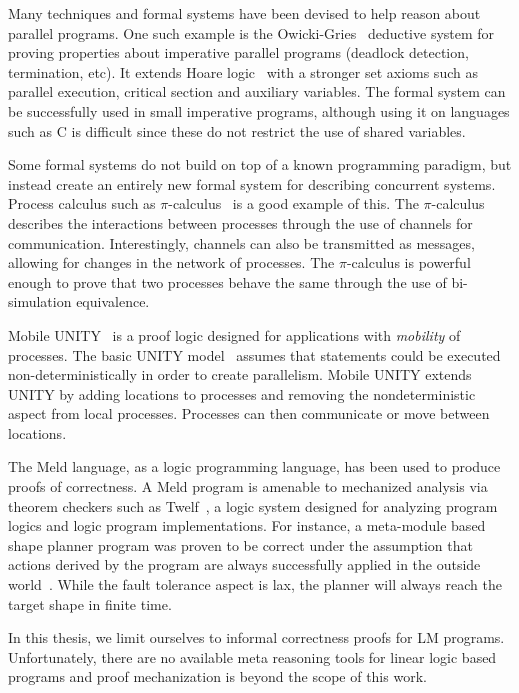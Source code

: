 Many techniques and formal systems have been devised to help reason about
parallel programs.  One such example is the
Owicki-Gries~\cite{Owicki:1976:VPP:360051.360224} deductive system for proving
properties about imperative parallel programs (deadlock detection, termination,
etc). It extends Hoare logic~\cite{Hoare:1969} with a stronger set axioms such
as parallel execution, critical section and auxiliary variables. The formal
system can be successfully used in small imperative programs, although using it
on languages such as C is difficult since these do not restrict the use of
shared variables.

Some formal systems do not build on top of a known programming paradigm, but
instead create an entirely new formal system for describing concurrent systems.
Process calculus such as $\pi$-calculus~\cite{Milner:1999:CMS:329902} is a good
example of this. The $\pi$-calculus describes the interactions between
processes through the use of channels for communication. Interestingly, channels
can also be transmitted as messages, allowing for changes in the network of
processes. The $\pi$-calculus is powerful enough to prove that two processes
behave the same through the use of bi-simulation equivalence.

Mobile UNITY~\cite{Roman97anintroduction} is a proof logic designed for
applications with \emph{mobility} of processes. The basic UNITY
model~\cite{UNITY} assumes that statements could be executed
non-deterministically in order to create parallelism. Mobile UNITY extends UNITY
by adding locations to processes and removing the nondeterministic aspect from
local processes.  Processes can then communicate or move between locations.

The Meld language, as a logic programming language, has been used to produce
proofs of correctness. A Meld program is amenable to mechanized analysis via
theorem checkers such as Twelf~\cite{twelf}, a logic system designed for
analyzing program logics and logic program implementations. For instance, a
meta-module based shape planner program was proven to be correct under the
assumption that actions derived by the program are always successfully applied
in the outside world~\cite{dewey-iros08,ashley-rollman-iclp09}.  While the fault
tolerance aspect is lax, the planner will always reach the target shape in
finite time.

In this thesis, we limit ourselves to informal correctness proofs for LM
programs. Unfortunately, there are no available meta reasoning tools for linear
logic based programs and proof mechanization is beyond the scope of this work.
